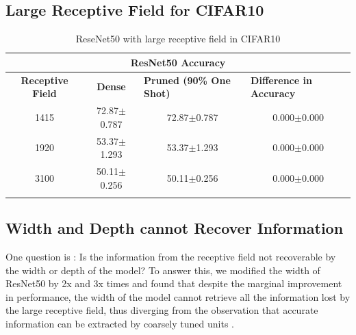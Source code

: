 \subsection{Large Receptive Field for CIFAR10}
\label{subsec:LargeRFCF10}

\begin{table}[H]
  \centering
\begin{tabular}{@{}cccc@{}}
\toprule
\multicolumn{4}{c}{\textbf{ResNet50 Accuracy}}                                                                                         \\ \midrule
\textbf{Receptive Field} & \textbf{Dense}  & \multicolumn{1}{l}{\textbf{Pruned (90\% One Shot)}} & \multicolumn{1}{l}{\textbf{Difference in Accuracy}} \\ \midrule
1415                     & 72.87$\pm$0.787 & 72.87$\pm$0.787                     & 0.000$\pm$0.000                                     \\
1920                     & 53.37$\pm$1.293 & 53.37$\pm$1.293                     & 0.000$\pm$0.000                                     \\
3100                     & 50.11$\pm$0.256 & 50.11$\pm$0.256                     & 0.000$\pm$0.000
\\ \bottomrule \\
\end{tabular}
\caption{ReseNet50 with large receptive field in CIFAR10}
\label{tab:cifar10  largeRF one shot pruning rate 09}
\end{table}



\subsection{Width and Depth cannot Recover Information}

One question is : Is the information from the receptive field not recoverable by the width or depth of the model? To
answer this, we modified the width of ResNet50 by 2x and 3x times and found that despite the marginal improvement in performance, the width
of the model cannot retrieve all the information lost by the large receptive field, thus diverging from the observation that
accurate information can be extracted by coarsely tuned units \citep{ballardParallelVisualComputation1983}.


